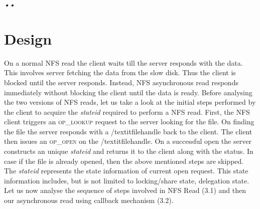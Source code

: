 \textit{\emph{•\emph{\textit{•}}}}\section{Design}

\label{Design}

On a normal NFS read the client waits till the server responds with the data. This involves server fetching the data from the slow disk. Thus the client is blocked until the server responds. Instead, NFS asynchronous read responds immediately without blocking the client until the data is ready. Before analysing the two versions of NFS reads, let us take a look at the initial steps performed by the client to acquire the \textit{stateid} required to perform a NFS read. First, the NFS client triggers an \textsc{op\_lookup} request to the server looking for the file. On finding the file the server responds with a /textit{filehandle} back to the client. The client then issues an \textsc{op\_open} on the /textit{filehandle}. On a successful open the server constructs an unique \textit{stateid} and returns it to the client along with the status. In case if the file is already opened,    then the above mentioned steps are skipped. The \textit{stateid} represents the state information of current open request. This state information includes, but is not limited to locking/share state, delegation state. Let us now analyse the sequence of steps involved in NFS Read (3.1) and then our asynchronous read using callback mechanism (3.2).

